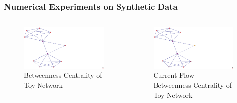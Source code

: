 \documentclass{beamer}
\begin{document}
\begin{frame}
\frametitle{Numerical Experiments on Synthetic Data}
\begin{columns}[T]
\begin{column}{.5\textwidth}
\begin{figure}[h]
\begin{center}
\includegraphics[width=0.76\columnwidth]{toy_betweenness}
\end{center}
\caption{Betweenness Centrality of Toy Network}
\label{fig:Betweenness Centrality - Toy}
\end{figure}
\end{column}
\begin{column}{.5\textwidth}
\begin{figure}[h]
\begin{center}
\includegraphics[width=0.76\columnwidth]{toy_current_flow_betweenness}
\end{center}
\caption{Current-Flow Betweenness Centrality of Toy Network}
\label{fig:Current Flow Betweenness Centrality - Toy}
\end{figure}
\end{column}
\end{columns}
\end{frame}
\end{document}
